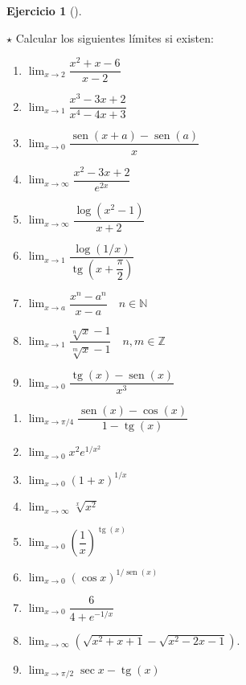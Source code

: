 \documentclass[
  a4paper,
]{scrreport}
\theoremstyle{definition}
\newtheorem{exercise}{Ejercicio}[chapter]
\theoremstyle{remark}
\begin{document}
\begin{exercise}[]\protect\hypertarget{exr-limites-1}{}\label{exr-limites-1}

\(\star\) Calcular los siguientes límites si existen:

\begin{enumerate}
\def\labelenumi{\alph{enumi}.}
\item
  \(\displaystyle \lim_{x\to 2} \dfrac{x^2+x-6}{x-2}\)
\item
  \(\displaystyle \lim_{x\to 1}\dfrac{x^3-3x+2}{x^4-4x+3}\)
\item
  \(\displaystyle \lim_{x\to 0}\dfrac{\operatorname{sen}(x+a)-\operatorname{sen}(a)}{x}\)
\item
  \(\displaystyle \lim_{x\to\infty}\dfrac{x^2-3x+2}{e^{2x}}\)
\item
  \(\displaystyle \lim_{x\to\infty}\dfrac{\log(x^2-1)}{x+2}\)
\item
  \(\displaystyle \lim_{x\to 1}\dfrac{\log(1/x)}{\operatorname{tg}(x+\dfrac{\pi}{2})}\)
\item
  \(\displaystyle \lim_{x\to a}\dfrac{x^n-a^n}{x-a}\quad n\in \mathbb{N}\)
\item
  \(\displaystyle \lim_{x\to 1}\dfrac{\sqrt[n]{x}-1}{\sqrt[m]{x}-1} \quad n,m \in \mathbb{Z}\)
\item
  \(\displaystyle \lim_{x\to 0}\dfrac{\operatorname{tg}(x)-\operatorname{sen}(x)}{x^3}\)
\end{enumerate}

\begin{enumerate}
\def\labelenumi{\alph{enumi}.}
\setcounter{enumi}{9}
\item
  \(\displaystyle \lim_{x\to \pi/4}\dfrac{\operatorname{sen}(x)-\cos(x)}{1-\operatorname{tg}(x)}\)
\item
  \(\displaystyle \lim_{x\to 0}x^2e^{1/x^2}\)
\item
  \(\displaystyle \lim_{x\to 0}\left(1+x\right)^{1/x}\)
\item
  \(\displaystyle \lim_{x\to \infty} \sqrt[x]{x^2}\)
\item
  \(\displaystyle \lim_{x\to 0}\left(\dfrac{1}{x}\right)^{\operatorname{tg}(x)}\)
\item
  \(\displaystyle \lim_{x\to 0}(\cos x)^{1/\operatorname{sen}(x)}\)
\item
  \(\displaystyle \lim_{x\to 0}\dfrac{6}{4+e^{-1/x}}\)
\item
  \(\displaystyle \lim_{x\to \infty}\left(\sqrt{x^2+x+1}-\sqrt{x^2-2x-1}\right)\).
\item
  \(\displaystyle \lim_{x\to \pi/2}\sec x-\operatorname{tg}(x)\)
\end{enumerate}

\end{exercise}
\end{document}

